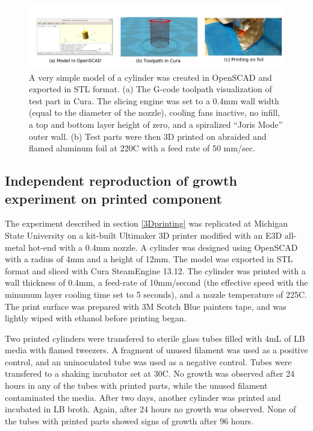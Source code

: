 \begin{refsection}
\begin{figure}
    \includegraphics[width=1.0\textwidth]{sterility/figures/Fig5}
    
    \caption{A very simple model of a cylinder was created in OpenSCAD
      and exported in STL format. (a) The G-code toolpath
      visualization of test part in Cura. The slicing engine was set
      to a 0.4mm wall width (equal to the diameter of the nozzle),
      cooling fans inactive, no infill, a top and bottom layer height
      of zero, and a spiralized ``Joris Mode'' outer wall. (b) Test
      parts were then 3D printed on abraided and flamed aluminum foil
      at 220C with a feed rate of 50 mm/sec. }
 
    \label{fig:3Dparts}
\end{figure}

\subsection{Independent reproduction of growth experiment on printed component}

The experiment described in section \ref{3Dprinting} was replicated at
Michigan State University on a kit-built Ultimaker 3D printer modified
with an E3D all-metal hot-end with a 0.4mm nozzle. A cylinder was
designed using OpenSCAD with a radius of 4mm and a height of 12mm. The
model was exported in STL format and sliced with Cura SteamEngine
13.12. The cylinder was printed with a wall thickness of 0.4mm, a
feed-rate of 10mm/second (the effective speed with the minumum layer
cooling time set to 5 seconds), and a nozzle temperature of 225C. The
print surface was prepared with 3M Scotch Blue painters tape, and was
lightly wiped with ethanol before printing began.

Two printed cylinders were transfered to sterile glass tubes filled
with 4mL of LB media with flamed tweezers. A fragment of unused
filament was used as a positive control, and an uninoculated tube was
used as a negative control.  Tubes were transfered to a shaking
incubator set at 30C. No growth was observed after 24 hours in any of
the tubes with printed parts, while the unused filament contaminated
the media. After two days, another cylinder was printed and incubated
in LB broth. Again, after 24 hours no growth was observed. None of the
tubes with printed parts showed signs of growth after 96 hours.


\end{refsection}
